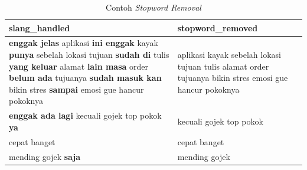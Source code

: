\begin{enumerate}
\begin{enumerate}
    \begin{table}[H]
      \centering
      \caption{Contoh \emph{Stopword Removal}}
      \label{tab:contoh_stopword_removal}
      \begin{tabularx}{\columnwidth}{|X|X|}
        \hline
        slang\_handled                                                                                                                                                                                                                                                                                                   & stopword\_removed                                                                                      \\ \hline
        {\bfseries enggak jelas} aplikasi {\bfseries ini enggak} kayak {\bfseries punya} sebelah lokasi tujuan {\bfseries sudah di} tulis {\bfseries yang keluar} alamat {\bfseries lain masa} order {\bfseries belum ada} tujuanya {\bfseries sudah masuk kan} bikin stres {\bfseries sampai} emosi gue hancur pokoknya & aplikasi kayak sebelah lokasi tujuan tulis alamat order tujuanya bikin stres emosi gue hancur pokoknya \\ \hline
        {\bfseries enggak ada lagi} kecuali gojek top pokok {\bfseries ya}                                                                                                                                                                                                                                               & kecuali gojek top pokok                                                                                \\ \hline
        cepat banget                                                                                                                                                                                                                                                                                                     & cepat banget                                                                                           \\ \hline
        mending gojek {\bfseries saja}                                                                                                                                                                                                                                                                                   & mending gojek                                                                                          \\ \hline
      \end{tabularx}
    \end{table}


\end{enumerate}
\end{enumerate}
